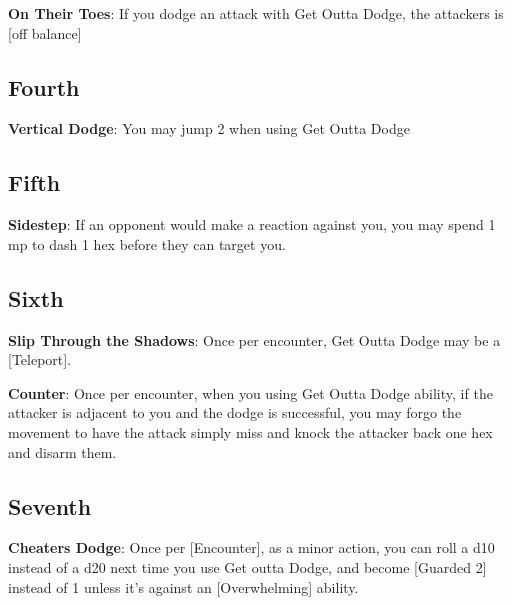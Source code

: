 \begin{multicols*}{2}
\textbf{On Their Toes}: If you dodge an attack with Get Outta Dodge, the attackers is [off balance]

\subsection*{Fourth \Facet\perk}
\textbf{Vertical Dodge}: You may jump 2 when using Get Outta Dodge

\subsection*{Fifth \Facet\perk}
\textbf{Sidestep}: If an opponent would make a reaction against you, you may spend 1 mp to dash 1 hex before they can target you.

\subsection*{Sixth \Facet}
\textbf{Slip Through the Shadows}: Once per encounter, Get Outta Dodge may be a [Teleport].

\textbf{Counter}: Once per encounter, when you using Get Outta Dodge ability, if the attacker is adjacent to you and the dodge is successful, you may forgo the movement to have the attack simply miss and knock the attacker back one hex and disarm them.

\subsection*{Seventh \Facet\perk}
\textbf{Cheaters Dodge}: Once per [Encounter], as a minor action, you can roll a d10 instead of a d20 next time you use Get outta Dodge, and become [Guarded 2] instead of 1 unless it's against an [Overwhelming] ability.
\end{multicols*}

